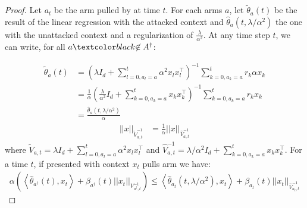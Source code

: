 \begin{proof}
Let $a_{t}$ be the arm pulled by \linucb at time $t$. For each arms $a$, let $\tilde{\theta}_a(t)$ be the result of the linear regression with the attacked context and $\hat{\theta}_{a}(t, \lambda/\alpha^{2})$ the one with the unattacked context and a regularization of $\frac{\lambda}{\alpha^{2}}$. At any time step $t$, we can write, for all $a\changebrtwo{\not\in A^\dagger}$:

\begin{align*}
\tilde{\theta}_a(t) &=  \left(\lambda I_d + \sum_{l=0, a_{l} = a}^{t} \alpha^{2} x_l x_l^{\intercal}\right)^{-1} \sum_{k=0, a_{k} = a}^{t} r_k \alpha x_{k} \\
&= \frac{1}{\alpha} \left(\frac{\lambda}{\alpha^2} I_d + \sum_{k=0, a_{k} = a}^t x_k x_k^{\intercal}\right)^{-1} \sum_{k=0, a_{k} = a}^t r_k x_k \\
&= \frac{\hat{\theta}_{a}(t,\lambda/\alpha^{2})}{\alpha}
\end{align*}
\begin{align}
    ||x||_{\tilde{V}_{a,t}^{-1}}&= \frac{1}{\alpha} ||x||_{\hat{V}_{a,t}^{-1}}
\end{align}
where $\tilde{V}_{a,t} = \lambda I_d + \sum_{l=0, a_{l} = a}^{t} \alpha^{2} x_l x_l^{\intercal}$ and $\hat{V}_{a,t}^{-1} =\lambda/ \alpha^2 I_d + \sum_{k=0, a_{k} = a}^t x_k x_k^{\intercal}$. For a time $t$, if presented with context $x_{t}$ \linucb pulls arm  we have:
\begin{align*}
\alpha\left(\left\langle \hat{\theta}_{a^\dagger}(t), x_{t} \right\rangle +\beta_{a^\dagger}(t)||x_t||_{V_{a^\dagger,t}^{-1}}\right)\leq \left\langle \hat{\theta}_{a_{t}}(t, \lambda/\alpha^{2}), x_{t} \right\rangle +  \beta_{a_{t}}(t)||x_{t}||_{\hat{V}_{a_{t},t}^{-1}} 
\end{align*}


\end{proof}

